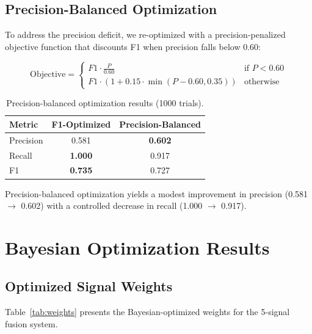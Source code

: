 \subsection{Precision-Balanced Optimization}

To address the precision deficit, we re-optimized with a precision-penalized objective function that discounts F1 when precision falls below 0.60:

\begin{equation}
    \text{Objective} = \begin{cases}
        F1 \cdot \frac{P}{0.60} & \text{if } P < 0.60 \\
        F1 \cdot (1 + 0.15 \cdot \min(P - 0.60, 0.35)) & \text{otherwise}
    \end{cases}
\end{equation}

\begin{table}[!htbp]
    \centering
    \caption{Precision-balanced optimization results (1000 trials).}
    \label{tab:balanced}
    \begin{tabular}{lcc}
        \toprule
        Metric & F1-Optimized & Precision-Balanced \\
        \midrule
        Precision & 0.581 & \textbf{0.602} \\
        Recall & \textbf{1.000} & 0.917 \\
        F1 & \textbf{0.735} & 0.727 \\
        \bottomrule
    \end{tabular}
\end{table}

Precision-balanced optimization yields a modest improvement in precision (0.581 $\rightarrow$ 0.602) with a controlled decrease in recall (1.000 $\rightarrow$ 0.917).

\section{Bayesian Optimization Results}

\subsection{Optimized Signal Weights}

Table~\ref{tab:weights} presents the Bayesian-optimized weights for the 5-signal fusion system.

